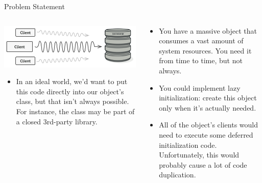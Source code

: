 \documentclass[13pt]{beamer}
\begin{document}
\begin{frame}{Problem Statement}
	\begin{columns}[T]
		\begin{column}{.5\textwidth}
			\begin{center}
			\includegraphics[scale=0.35]{./images/problem.png}
			\begin{itemize}
			\item In an ideal world, we’d want to put this code directly into our object’s class, but that isn’t always possible. For instance, the class may be part of a closed 3rd-party library.
			\end{itemize}
			\end{center}
		\end{column}
	
		\begin{column}{.5\textwidth}
			\begin{itemize}
				\item You have a massive object that consumes a vast amount of system resources. You need it from time to time, but not always.
				\item You could implement lazy initialization: create this object only when it’s actually needed.
				\item All of the object’s clients would need to execute some deferred initialization code. Unfortunately, this would probably cause a lot of code duplication.
			\end{itemize}
		\end{column}
	\end{columns}
\end{frame}
\end{document}
